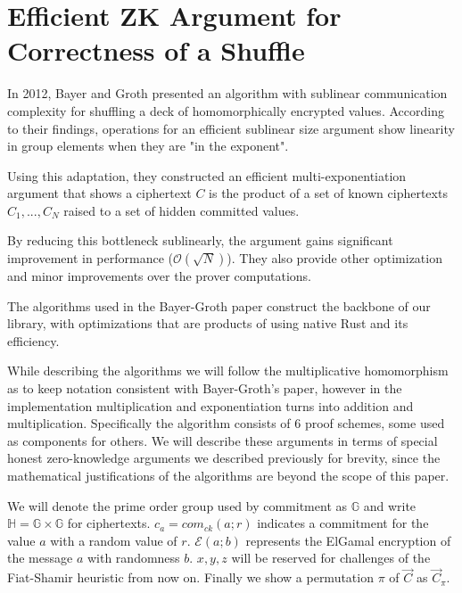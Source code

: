 \documentclass[12pt,a4paper]{report}
\begin{document}
\section{Efficient ZK Argument for Correctness of a Shuffle}
In 2012, Bayer and Groth \cite{bgshuffle} presented an algorithm with sublinear 
communication complexity for shuffling a deck of homomorphically encrypted values.
According to their findings, operations for an efficient sublinear size argument
show linearity in group elements when they are "in the exponent". \par
Using this adaptation, they constructed an efficient multi-exponentiation argument that shows a ciphertext
$C$ is the product of a set of known ciphertexts $C_1,...,C_N$ raised to a set of
hidden committed values. \par 
By reducing this bottleneck sublinearly, the argument 
gains significant improvement in performance ($\mathcal{O}(\sqrt{N})$).
They also provide other optimization and minor improvements over the prover computations.\par
The algorithms used in the Bayer-Groth paper construct the backbone of our library,
with optimizations that are products of using native Rust and its efficiency.\par
While describing the algorithms we will follow the multiplicative homomorphism as to keep notation consistent with Bayer-Groth's paper, 
however in the implementation multiplication and exponentiation turns into addition and multiplication.
Specifically the algorithm consists of 6 proof schemes, some used as components for others.
We will describe these arguments in terms of special honest zero-knowledge arguments we described previously for brevity, 
since the mathematical justifications of the algorithms are beyond the scope of this paper.\par
We will denote the prime order group used by commitment as $\mathbb{G}$ and write $\mathbb{H} = \mathbb{G} \times \mathbb{G}$ for ciphertexts.
$c_a = com_{ck}(a; r)$ indicates a commitment for the value $a$ with a random value of $r$.
$\mathcal{E}(a; b)$ represents the ElGamal encryption of the message $a$ with randomness $b$.
$x, y, z$ will be reserved for challenges of the Fiat-Shamir heuristic from now on.
Finally we show a permutation $\pi$ of $\vec{C}$ as $\vec{C}_\pi$.
\end{document}
